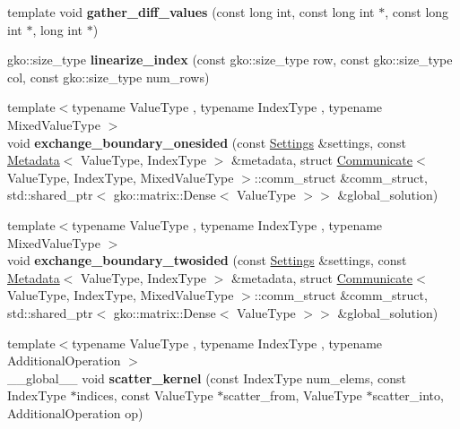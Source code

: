 \begin{DoxyCompactItemize}
template void {\bfseries gather\+\_\+diff\+\_\+values} (const long int, const long int $\ast$, const long int $\ast$, long int $\ast$)
\item 
\mbox{\label{namespaceschwz_a443a272fc6c66825dc7a958e824e32e3}} 
gko\+::size\+\_\+type {\bfseries linearize\+\_\+index} (const gko\+::size\+\_\+type row, const gko\+::size\+\_\+type col, const gko\+::size\+\_\+type num\+\_\+rows)
\item 
\mbox{\label{namespaceschwz_a4c99059ae93f77311f4a14d28774c0d3}} 
{\footnotesize template$<$typename Value\+Type , typename Index\+Type , typename Mixed\+Value\+Type $>$ }\\void {\bfseries exchange\+\_\+boundary\+\_\+onesided} (const \hyperlink{structschwz_1_1Settings}{Settings} \&settings, const \hyperlink{structschwz_1_1Metadata}{Metadata}$<$ Value\+Type, Index\+Type $>$ \&metadata, struct \hyperlink{classschwz_1_1Communicate}{Communicate}$<$ Value\+Type, Index\+Type, Mixed\+Value\+Type $>$\+::comm\+\_\+struct \&comm\+\_\+struct, std\+::shared\+\_\+ptr$<$ gko\+::matrix\+::\+Dense$<$ Value\+Type $>$$>$ \&global\+\_\+solution)
\item 
\mbox{\label{namespaceschwz_a5c58f9da7e21d6671295b7b62f45b33f}} 
{\footnotesize template$<$typename Value\+Type , typename Index\+Type , typename Mixed\+Value\+Type $>$ }\\void {\bfseries exchange\+\_\+boundary\+\_\+twosided} (const \hyperlink{structschwz_1_1Settings}{Settings} \&settings, const \hyperlink{structschwz_1_1Metadata}{Metadata}$<$ Value\+Type, Index\+Type $>$ \&metadata, struct \hyperlink{classschwz_1_1Communicate}{Communicate}$<$ Value\+Type, Index\+Type, Mixed\+Value\+Type $>$\+::comm\+\_\+struct \&comm\+\_\+struct, std\+::shared\+\_\+ptr$<$ gko\+::matrix\+::\+Dense$<$ Value\+Type $>$$>$ \&global\+\_\+solution)
\item 
\mbox{\label{namespaceschwz_a1149b1cad510b1ae7285480c970fd2b3}} 
{\footnotesize template$<$typename Value\+Type , typename Index\+Type , typename Additional\+Operation $>$ }\\\+\_\+\+\_\+global\+\_\+\+\_\+ void {\bfseries scatter\+\_\+kernel} (const Index\+Type num\+\_\+elems, const Index\+Type $\ast$indices, const Value\+Type $\ast$scatter\+\_\+from, Value\+Type $\ast$scatter\+\_\+into, Additional\+Operation op)

\end{DoxyCompactItemize}
